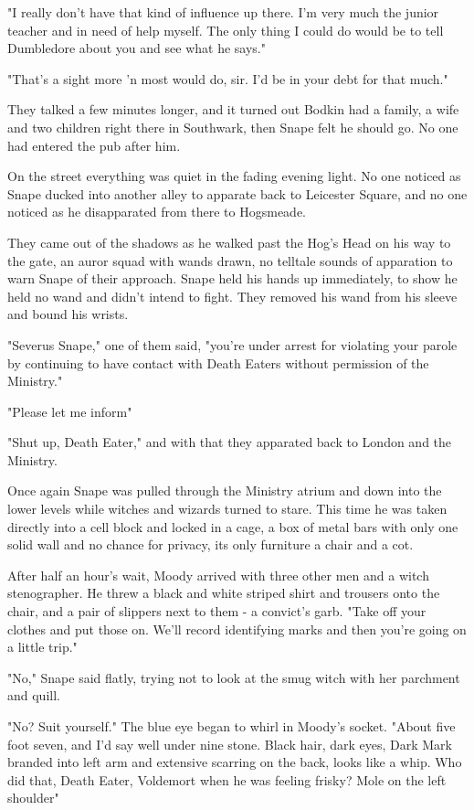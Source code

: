 "I really don't have that kind of influence up there. I'm very much the junior teacher and in need of help myself. The only thing I could do would be to tell Dumbledore about you and see what he says."

"That's a sight more 'n most would do, sir. I'd be in your debt for that much."

They talked a few minutes longer, and it turned out Bodkin had a family, a wife and two children right there in Southwark, then Snape felt he should go. No one had entered the pub after him.

On the street everything was quiet in the fading evening light. No one noticed as Snape ducked into another alley to apparate back to Leicester Square, and no one noticed as he disapparated from there to Hogsmeade.

They came out of the shadows as he walked past the Hog's Head on his way to the gate, an auror squad with wands drawn, no telltale sounds of apparation to warn Snape of their approach. Snape held his hands up immediately, to show he held no wand and didn't intend to fight. They removed his wand from his sleeve and bound his wrists.

"Severus Snape," one of them said, "you're under arrest for violating your parole by continuing to have contact with Death Eaters without permission of the Ministry."

"Please let me inform{\el}"

"Shut up, Death Eater," and with that they apparated back to London and the Ministry.

Once again Snape was pulled through the Ministry atrium and down into the lower levels while witches and wizards turned to stare. This time he was taken directly into a cell block and locked in a cage, a box of metal bars with only one solid wall and no chance for privacy, its only furniture a chair and a cot.

After half an hour's wait, Moody arrived with three other men and a witch stenographer. He threw a black and white striped shirt and trousers onto the chair, and a pair of slippers next to them - a convict's garb. "Take off your clothes and put those on. We'll record identifying marks and then you're going on a little trip."

"No," Snape said flatly, trying not to look at the smug witch with her parchment and quill.

"No? Suit yourself." The blue eye began to whirl in Moody's socket. "About five foot seven, and I'd say well under nine stone. Black hair, dark eyes, Dark Mark branded into left arm and extensive scarring on the back, looks like a whip. Who did that, Death Eater, Voldemort when he was feeling frisky? Mole on the left shoulder{\el}"

